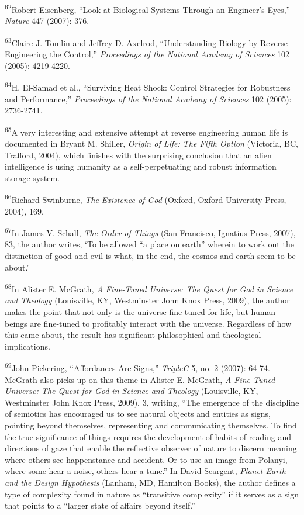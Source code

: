 \textsuperscript{62}Robert Eisenberg, “Look at Biological Systems
Through an Engineer’s Eyes,” \textit{Nature} 447 (2007): 376.


\textsuperscript{63}Claire J. Tomlin and Jeffrey D. Axelrod,
“Understanding Biology by Reverse Engineering the Control,”
\textit{Proceedings of the National Academy of Sciences} 102 (2005):
4219-4220.


\textsuperscript{64}H. El-Samad et al., “Surviving Heat Shock: Control
Strategies for Robustness and Performance,” \textit{Proceedings of the
National Academy of Sciences} 102 (2005): 2736-2741.


\textsuperscript{65}A very interesting and extensive attempt at reverse
engineering human life is documented in Bryant M. Shiller,
\textit{Origin of Life: The Fifth Option} (Victoria, BC, Trafford,
2004), which finishes with the surprising conclusion that an alien
intelligence is using humanity as a self-perpetuating and robust
information storage system.


\textsuperscript{66}Richard Swinburne, \textit{The Existence of God 
}(Oxford, Oxford University Press, 2004), 169.


\textsuperscript{67}In James V. Schall, \textit{The Order of Things
}(San Francisco, Ignatius Press, 2007), 83, the author writes, ‘To be
allowed “a place on earth” wherein to work out the distinction of good
and evil is what, in the end, the cosmos and earth seem to be about.’


\textsuperscript{68}In Alister E. McGrath, \textit{A Fine-Tuned
Universe: The Quest for God in Science and Theology }(Louisville, KY,
Westminster John Knox Press, 2009), the author makes the point that not
only is the universe fine-tuned for life, but human beings are
fine-tuned to profitably interact with the universe. Regardless of how
this came about, the result has significant philosophical and
theological implications.


\textsuperscript{69}John Pickering, “Affordances Are Signs,”
\textit{TripleC} 5, no. 2 (2007): 64-74. McGrath also picks up on this
theme in Alister E. McGrath, \textit{A Fine-Tuned Universe: The Quest
for God in Science and Theology }(Louisville, KY, Westminster John Knox
Press, 2009), 3, writing, “The emergence of the discipline of semiotics
has encouraged us to see natural objects and entities as signs,
pointing beyond themselves, representing and communicating themselves.
To find the true significance of things requires the development of
habits of reading and directions of gaze that enable the reflective
observer of nature to discern meaning where others see happenstance and
accident. Or to use an image from Polanyi, where some hear a noise,
others hear a tune.” In David Seargent, \textit{Planet Earth and the
Design Hypothesis} (Lanham, MD, Hamilton Books), the author defines a
type of complexity found in nature as “transitive complexity” if it
serves as a sign that points to a “larger state of affairs beyond
itself.”


